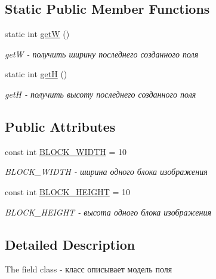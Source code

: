 \subsection*{Static Public Member Functions}
\begin{DoxyCompactItemize}
\item 
static int \hyperlink{classfield_ad7e4bc6120a1361f6a35fd971b1f3117}{get\+W} ()
\begin{DoxyCompactList}\small\item\em get\+W -\/ получить ширину последнего созданного поля \end{DoxyCompactList}\item 
static int \hyperlink{classfield_a448b10832582b5d2d3d6d8df9ce9a900}{get\+H} ()
\begin{DoxyCompactList}\small\item\em get\+H -\/ получить высоту последнего созданного поля \end{DoxyCompactList}\end{DoxyCompactItemize}
\subsection*{Public Attributes}
\begin{DoxyCompactItemize}
\item 
\hypertarget{classfield_a289fd27a869500e67777681600857c5a}{}const int \hyperlink{classfield_a289fd27a869500e67777681600857c5a}{B\+L\+O\+C\+K\+\_\+\+W\+I\+D\+T\+H} = 10\label{classfield_a289fd27a869500e67777681600857c5a}

\begin{DoxyCompactList}\small\item\em B\+L\+O\+C\+K\+\_\+\+W\+I\+D\+T\+H -\/ ширина одного блока изображения \end{DoxyCompactList}\item 
\hypertarget{classfield_a6a662370eedab7fd586e15f1f8ee49cc}{}const int \hyperlink{classfield_a6a662370eedab7fd586e15f1f8ee49cc}{B\+L\+O\+C\+K\+\_\+\+H\+E\+I\+G\+H\+T} = 10\label{classfield_a6a662370eedab7fd586e15f1f8ee49cc}

\begin{DoxyCompactList}\small\item\em B\+L\+O\+C\+K\+\_\+\+H\+E\+I\+G\+H\+T -\/ высота одного блока изображения \end{DoxyCompactList}\end{DoxyCompactItemize}


\subsection{Detailed Description}
The field class -\/ класс описывает модель поля 

